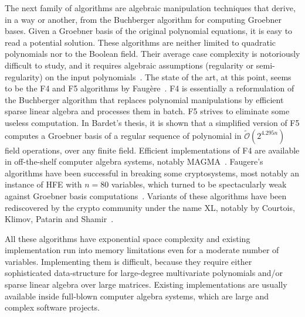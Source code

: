 \documentclass[a4paper,UKenglish,cleveref, autoref]{lipics-v2019}
\newcommand{\bigOsoft}[1]{\ensuremath{\mathcal{\tilde O}\left( #1 \right)} }
\begin{document}
The next family of algorithms are algebraic manipulation techniques that derive,
in a way or another, from the Buchberger algorithm for computing Groebner
bases. Given a Groebner basis of the original polynomial equations, it is easy
to read a potential solution. These algorithms are neither limited to quadratic
polynomials nor to the Boolean field. Their average case complexity is
notoriously difficult to study, and it requires algebraic assumptions
(regularity or semi-regularity) on the input polynomials~\cite{BardetFS15}.  The
state of the art, at this point, seems to be the F4 and F5 algorithms by
Faugère~\cite{F4,F5}. F4 is essentially a reformulation of the Buchberger
algorithm that replaces polynomial manipulations by efficient sparse linear
algebra and processes them in batch. F5 strives to eliminate some useless
computation. In Bardet's thesis, it is shown that a simplified version of F5
computes a Groebner basis of a regular sequence of polynomial in
$\bigOsoft{2^{4.295n}}$ field operations, over any finite field. Efficient
implementations of F4 are available in off-the-shelf computer algebra systems,
notably \textsf{MAGMA}~\cite{MAGMA}. Faugere's algorithms have been successful
in breaking some cryptosystems, most notably an instance of HFE with $n=80$
variables, which turned to be spectacularly weak against Groebner basis
computations~\cite{FaugereJ03}. Variants of these algorithms have been
rediscovered by the crypto community under the name XL, notably by Courtois,
Klimov, Patarin and Shamir~\cite{CourtoisKPS00}.

All these algorithms have exponential space complexity and existing
implementation run into memory limitations even for a moderate number of
variables. Implementing them is difficult, because they require either
sophisticated data-structure for large-degree multivariate polynomials and/or
sparse linear algebra over large matrices. Existing implementations are usually
available inside full-blown computer algebra systems, which are large and
complex software projects.
\end{document}
